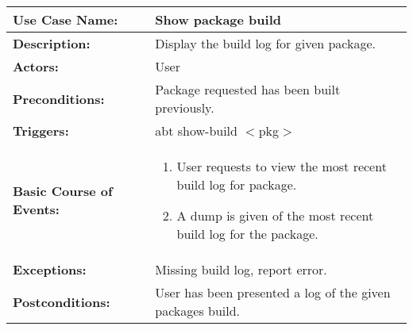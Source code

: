 
\begin{tabularx}{\linewidth}{|l|X|}
\hline
\textbf{Use Case Name:} & \textbf{Show package build} \\
\hline
\textbf{Description:} & Display the build log for given package. \\
\hline
\textbf{Actors:} & User \\
\hline
\textbf{Preconditions:} & Package requested has been built previously. \\
\hline
\textbf{Triggers:} & abt show-build $<$pkg$>$ \\
\hline
\textbf{Basic Course of Events:} & 
\begin{minipage}{\linewidth} 
  \vspace{0.05em}
  \begin{enumerate}
    \item User requests to view the most recent build log for package.
    \item A dump is given of the most recent build log for the package.
  \end{enumerate}
  \vspace{0.05em}
\end{minipage}
\\
\hline 
\textbf{Exceptions:} & Missing build log, report error. \\
\hline 
\textbf{Postconditions:} &
User has been presented a log of the given packages build. \\
\hline
\end{tabularx}


